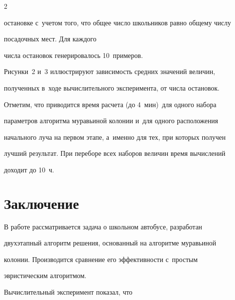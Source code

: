 \begin{multicols}{2}



\noindent

остановке с~учетом того, что общее число школьников равно общему чис\-лу

посадочных мест. Для каждого

чис\-ла остановок генерировалось 10~примеров.

{



}



     Рисунки~2 и~3 иллюстрируют зависимость средних значений величин,

полученных в~ходе вы\-чис\-ли\-тельного эксперимента, от числа остановок.

     	



     Отметим, что приводится время расчета (до 4~мин)\ для одного набора

параметров алгоритма муравьиной колонии и~для одного расположения

начального луча на первом этапе, а~именно для тех, при которых получен

лучший результат. При переборе всех наборов величин время вычислений

доходит до 10~ч.



\vspace*{-14pt}





    \section{Заключение}



    \vspace*{-4pt}



В работе рассматривается задача о школьном автобусе, разработан

двухэтапный алгоритм решения, основанный на алгоритме муравьиной

колонии. Производится сравнение его эффективности с~простым

эвристическим алгоритмом.



	Вычислительный эксперимент показал, что


\end{multicols}
